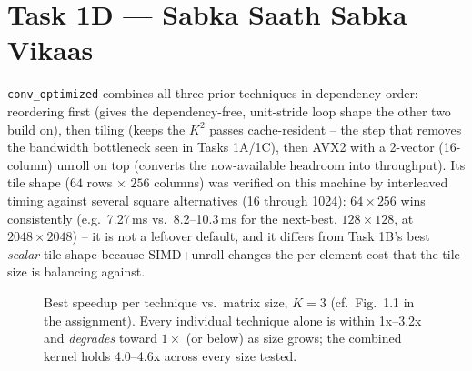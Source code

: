 \documentclass[11pt]{article}
\begin{document}
\section{Task 1D --- Sabka Saath Sabka Vikaas}
\label{sec:1d}

\texttt{conv\_optimized} combines all three prior techniques in dependency order:
reordering first (gives the dependency-free, unit-stride loop shape the other two build
on), then tiling (keeps the $K^2$ passes cache-resident -- the step that removes the
bandwidth bottleneck seen in Tasks 1A/1C), then AVX2 with a 2-vector (16-column) unroll
on top (converts the now-available headroom into throughput). Its tile shape
($64$ rows $\times$ $256$ columns) was verified on this machine by interleaved timing
against several square alternatives (16 through 1024): $64{\times}256$ wins consistently
(e.g.\ 7.27\,ms vs.\ 8.2--10.3\,ms for the next-best, $128{\times}128$, at
$2048{\times}2048$) -- it is not a leftover default, and it differs from Task 1B's best
\emph{scalar}-tile shape because SIMD+unroll changes the per-element cost that the tile
size is balancing against.

\begin{figure}[h]
\centering
{}
\caption{Best speedup per technique vs.\ matrix size, $K{=}3$ (cf.\ Fig.~1.1 in the
assignment). Every individual technique alone is within 1x--3.2x and \emph{degrades}
toward $1{\times}$ (or below) as size grows; the combined kernel holds 4.0--4.6x across
every size tested.}
\end{figure}
\end{document}
